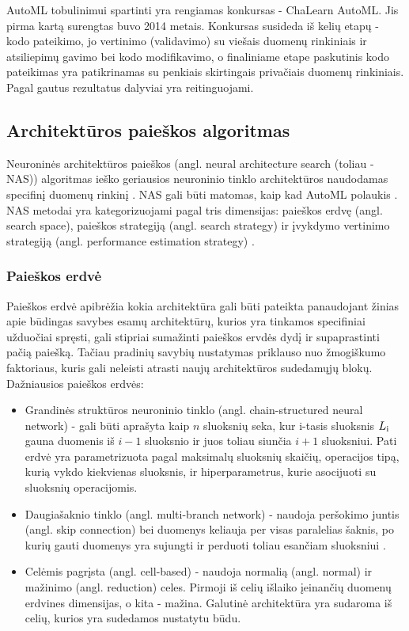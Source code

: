 \documentclass{VUMIFPSbakalaurinis}
\begin{document}
AutoML tobulinimui spartinti yra rengiamas konkursas - ChaLearn AutoML. Jis pirma kartą surengtas buvo 2014 metais. Konkursas susideda iš kelių etapų - kodo pateikimo, jo vertinimo (validavimo) su viešais duomenų rinkiniais ir atsiliepimų gavimo bei kodo modifikavimo, o finaliniame etape paskutinis kodo pateikimas yra patikrinamas su penkiais skirtingais privačiais duomenų rinkiniais. Pagal gautus rezultatus dalyviai yra reitinguojami.

\subsection{Architektūros paieškos algoritmas}

Neuroninės architektūros paieškos (angl. neural architecture search (toliau - NAS)) algoritmas ieško geriausios neuroninio tinklo architektūros naudodamas specifinį duomenų rinkinį \cite{8676019}. 
NAS gali būti matomas, kaip kad AutoML polaukis \cite{14f00e7a0861477a81f65b5c51f660f4}. 
NAS metodai yra kategorizuojami pagal tris dimensijas: paieškos erdvę (angl. search space), paieškos strategiją (angl. search strategy) ir įvykdymo vertinimo strategiją (angl. performance estimation strategy) \cite{elsken2018neural}.

\subsubsection{Paieškos erdvė}

Paieškos erdvė apibrėžia kokia architektūra gali būti pateikta panaudojant žinias apie būdingas savybes esamų architektūrų, kurios yra tinkamos specifiniai užduočiai spręsti, gali stipriai sumažinti paieškos ervdės dydį ir supaprastinti pačią paiešką. 
Tačiau pradinių savybių nustatymas priklauso nuo žmogiškumo faktoriaus, kuris gali neleisti atrasti naujų architektūros sudedamųjų blokų.
Dažniausios paieškos erdvės:
\begin{itemize}
    \item Grandinės struktūros neuroninio tinklo (angl. chain-structured neural network) - gali būti aprašyta kaip \(n\) sluoksnių seka, kur i-tasis sluoksnis \(L\textsubscript{i}\) gauna duomenis iš \(i-1\) sluoksnio ir juos toliau siunčia \(i+1\) sluoksniui. Pati erdvė yra parametrizuota pagal maksimalų sluoksnių skaičių, operacijos tipą, kurią vykdo kiekvienas sluoksnis, ir hiperparametrus, kurie asocijuoti su sluoksnių operacijomis.
    \item Daugiašaknio tinklo (angl. multi-branch network) - naudoja peršokimo juntis (angl. skip connection) bei duomenys keliauja per visas paralelias šaknis, po kurių gauti duomenys yra sujungti ir perduoti toliau esančiam sluoksniui \cite{DBLP:journals/corr/abs-1709-09582}. 
    \item Celėmis pagrįsta (angl. cell-based) - naudoja normalią (angl. normal) ir mažinimo (angl. reduction) celes. Pirmoji iš celių išlaiko įeinančių duomenų erdvines dimensijas, o kita - mažina. Galutinė architektūra yra sudaroma iš celių, kurios yra sudedamos nustatytu būdu.
\end{itemize}
\end{document}
